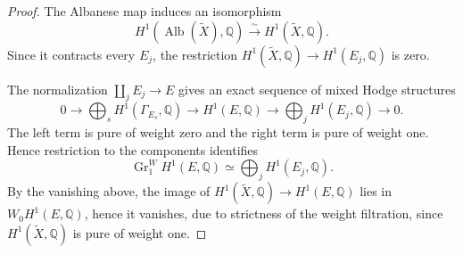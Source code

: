 \documentclass{amsart}
\theoremstyle{plain}
\theoremstyle{definition}
\newcommand{\bbQ}{\mathbb{Q}}
\DeclareMathOperator{\Gr}{Gr}
\begin{document}
\begin{proof}
The Albanese map induces an isomorphism
\[
H^1(\operatorname{Alb}(\widetilde X),\bbQ)
\xrightarrow{\sim}H^1(\widetilde X,\bbQ).
\]
Since it contracts every $E_j$, the restriction
$H^1(\widetilde X,\bbQ)\to H^1(E_j,\bbQ)$ is zero.

The normalization $\coprod_j E_j\to E$ gives an exact sequence of mixed Hodge structures
\[
0\longrightarrow
\bigoplus_s H^1(\Gamma_{E_s},\bbQ)
\longrightarrow H^1(E,\bbQ)
\longrightarrow\bigoplus_j H^1(E_j,\bbQ)
\longrightarrow0.
\]
The left term is pure of weight zero and the right term is pure of weight one. Hence restriction to the components identifies
\[
\Gr_1^W H^1(E,\bbQ)
\simeq\bigoplus_j H^1(E_j,\bbQ).
\]
By the vanishing above, the image of
$H^1(\widetilde X,\bbQ)\to H^1(E,\bbQ)$ lies in
$W_0H^1(E,\bbQ)$, hence it vanishes, due to strictness of the weight filtration, since $H^1(\widetilde X,\bbQ)$ is pure of weight one.
\end{proof}
\end{document}
